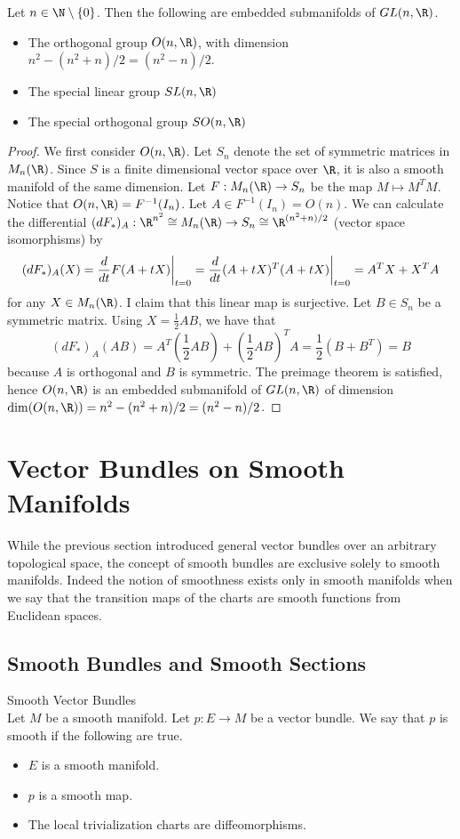 \documentclass[a4paper]{article}
\begin{document}
\begin{prp}{}{} Let $n\in\N\setminus\{0\}$. Then the following are embedded submanifolds of $GL(n,\R)$. 
\begin{itemize}
\item The orthogonal group $O(n,\R)$, with dimension $n^2-(n^2+n)/2=(n^2-n)/2$. 
\item The special linear group $SL(n,\R)$
\item The special orthogonal group $SO(n,\R)$
\end{itemize} 
\begin{proof}
We first consider $O(n,\R)$. Let $S_n$ denote the set of symmetric matrices in $M_n(\R)$. Since $S$ is a finite dimensional vector space over $\R$, it is also a smooth manifold of the same dimension. Let $F:M_n(\R)\to S_n$ be the map $M\mapsto M^TM$. Notice that $O(n,\R)=F^{-1}(I_n)$. Let $A\in F^{-1}(I_n)=O(n)$. We can calculate the differential $(dF_\ast)_A:\R^{n^2}\cong M_n(\R)\to S_n\cong\R^{(n^2+n)/2}$ (vector space isomorphisms) by $$(dF_\ast)_A(X)=\frac{d}{dt}F(A+tX)\bigg{|}_{t=0}=\frac{d}{dt}(A+tX)^T(A+tX)\bigg{|}_{t=0}=A^TX+X^TA$$ for any $X\in M_n(\R)$. I claim that this linear map is surjective. Let $B\in S_n$ be a symmetric matrix. Using $X=\frac{1}{2}AB$, we have that $$(dF_\ast)_A(AB)=A^T(\frac{1}{2}AB)+(\frac{1}{2}AB)^TA=\frac{1}{2}(B+B^T)=B$$ because $A$ is orthogonal and $B$ is symmetric. The preimage theorem is satisfied, hence $O(n,\R)$ is an embedded submanifold of $GL(n,\R)$ of dimension $\dim(O(n,\R))=n^2-(n^2+n)/2=(n^2-n)/2$. 
\end{proof}
\end{prp}

\pagebreak
\section{Vector Bundles on Smooth Manifolds}
While the previous section introduced general vector bundles over an arbitrary topological space, the concept of smooth bundles are exclusive solely to smooth manifolds. Indeed the notion of smoothness exists only in smooth manifolds when we say that the transition maps of the charts are smooth functions from Euclidean spaces. 

\subsection{Smooth Bundles and Smooth Sections}
\begin{defn}{Smooth Vector Bundles}{}\\
Let $M$ be a smooth manifold. Let $p:E\to M$ be a vector bundle. We say that $p$ is smooth if the following are true. 
\begin{itemize}
\item $E$ is a smooth manifold. 
\item $p$ is a smooth map. 
\item The local trivialization charts are diffeomorphisms. 
\end{itemize}
\end{defn}
\end{document}
